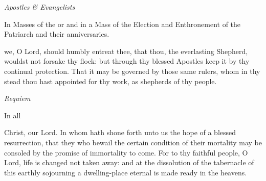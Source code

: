 \begin{multicols}{2}
\centerline{\textit{Apostles \& Evangelists}}
\begin{rubric}
	In Masses of the  or  and in a Mass of the Election and Enthronement of the Patriarch and their anniversaries.
\end{rubric}
 we, O Lord, should humbly entreat thee, that thou, the everlasting Shepherd, wouldst not forsake thy flock: but through thy blessed Apostles keep it by thy continual protection. That it may be governed by those same rulers, whom in thy stead thou hast appointed for thy work, as shepherds of thy people.\\

\centerline{\textit{Requiem}}
\begin{rubric}
	In all 
\end{rubric}
 Christ, our Lord. In whom hath shone forth unto us the hope of a blessed resurrection, that they who bewail the certain condition of their mortality may be consoled by the promise of immortality to come. For to thy faithful people, O Lord, life is changed not taken away: and at the dissolution of the tabernacle of this earthly sojourning a dwelling-place eternal is made ready in the heavens.

\end{multicols}
